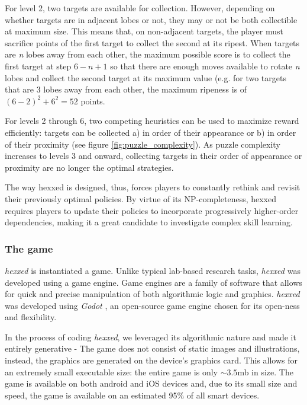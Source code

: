 \documentclass[11pt]{article}
\begin{document}
For level 2, two targets are available for collection. However, depending on whether targets are in adjacent lobes or not, they may or not be both collectible at maximum size. This means that, on non-adjacent targets, the player must sacrifice points of the first target to collect the second at its ripest. When targets are \textit{n} lobes away from each other, the maximum possible score is to collect the first target at step \(6 -\textit{n}+1\) so that there are enough moves available to rotate \textit{n} lobes and collect the second target at its maximum value (e.g. for two targets that are 3 lobes away from each other, the maximum ripeness is of \((6 - 2)^2 + 6^2 = 52\) points.

For levels 2 through 6, two competing heuristics can be used to maximize reward efficiently: targets can be collected a) in order of their appearance or b) in order of their proximity (see figure \ref{fig:puzzle_complexity}).
As puzzle complexity increases to levels 3 and onward, collecting targets in their order of appearance or proximity are no longer the optimal strategies.

The way hexxed is designed, thus, forces players to constantly rethink and revisit their previously optimal policies. By virtue of its NP-completeness, hexxed requires players to update their policies to incorporate progressively higher-order dependencies, making it a great candidate to investigate complex skill learning.

\subsubsection{The game}

\textit{hexxed} is instantiated a game. Unlike typical lab-based research tasks, \textit{hexxed} was developed using a game engine. Game engines are a family of software that allows for quick and precise manipulation of both algorithmic logic and graphics. \textit{hexxed} was developed using \textit{Godot} \cite{godot}, an open-source game engine chosen for its open-ness and flexibility.

In the process of coding \textit{hexxed}, we leveraged its algorithmic nature and made it entirely generative - The game does not consist of static images and illustrations, instead, the graphics are generated on the device's graphics card. This allows for an extremely small executable size: the entire game is only ${\sim}3.5$mb in size. The game is available on both android and iOS devices and, due to its small size and speed, the game is available on an estimated 95\% of all smart devices.
\end{document}
